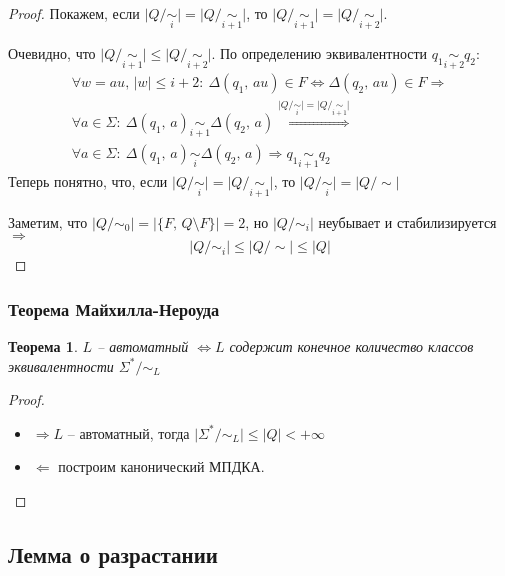 \documentclass[a4paper,12pt]{article}
\renewcommand{\leq}{\ensuremath{\leqslant}}
\theoremstyle{plain}
\newtheorem{theorem}{Теорема}[subsection]
\theoremstyle{definition}
\theoremstyle{remark}
\begin{document}
\begin{proof}
	Покажем, если $\vert Q / \underset{i}{\sim}\vert = \vert Q / \underset{i + 1}{\sim}\vert$, то $\vert Q / \underset{i + 1}{\sim}\vert = \vert Q / \underset{i + 2}{\sim}\vert$.

	Очевидно, что $\vert Q / \underset{i + 1}{\sim}\vert \leq \vert Q / \underset{i + 2}{\sim}\vert$. По определению эквивалентности $q_1 \underset{i + 2}{\sim} q_2$:
	\begin{align*}
		\forall w = au,\, \vert w \vert \leq i + 2 :\: \Delta(q_1,\, au) \in F \Leftrightarrow \Delta(q_2,\,au) \in F \Rightarrow                                                          \\
		\forall a \in \Sigma :\: \Delta(q_1,\, a) \underset{i + 1}{\sim} \Delta(q_2,\, a) \overset{\vert Q / \underset{i}{\sim}\vert = \vert Q / \underset{i + 1}{\sim}\vert}{\Rightarrow} \\
		\forall a \in \Sigma :\: \Delta(q_1,\, a) \underset{i}{\sim} \Delta(q_2,\,a) \Rightarrow q_1 \underset{i + 1}{\sim} q_2
	\end{align*}
	Теперь понятно, что, если $\vert Q / \underset{i}{\sim}\vert = \vert Q / \underset{i + 1}{\sim}\vert$, то $\vert Q / \underset{i}{\sim}\vert = \vert Q / \sim \vert$

	Заметим, что $\vert Q / \sim_0\vert = \vert\{F,\, Q \setminus F\}\vert = 2$, но $\vert Q / \sim_i\vert$ неубывает и стабилизируется $\Rightarrow$
	\[
		\vert Q / \sim_i\vert \leq \vert Q / \sim\vert \leq \vert Q\vert
	\]
\end{proof}

\subsubsection*{Теорема Майхилла-Нероуда}
\begin{theorem}
	$L$ -- автоматный $\Leftrightarrow L$ содержит конечное количество классов эквивалентности $\Sigma^* / \sim_L$
\end{theorem}

\begin{proof}
	\begin{itemize}
		\item $\Rightarrow L$ -- автоматный, тогда $\vert\Sigma^* /\sim_L\vert \leq \vert Q \vert < +\infty$
		\item $\Leftarrow$ построим канонический МПДКА.
	\end{itemize}
\end{proof}

\subsection{Лемма о разрастании}
\end{document}
